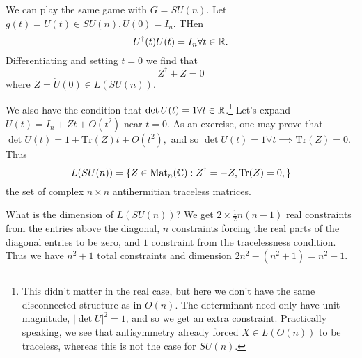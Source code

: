 \begin{exm}
We can play the same game with $G=SU(n)$. Let $g(t)=U(t)\in SU(n), U(0)=I_n$. THen
$$U^\dagger(t)U(t)= I_n \forall t\in \mathbb{R}.$$
Differentiating and setting $t=0$ we find that
$$Z^\dagger + Z=0$$ where $Z=\dot U(0)\in L(SU(n))$.

We also have the condition that $\det U(t)=1\forall t\in \mathbb{R}$.\footnote{This didn't matter in the real case, but here we don't have the same disconnected structure as in $O(n)$. The determinant need only have unit magnitude, $|\det U|^2=1$, and so we get an extra constraint. Practically speaking, we see that antisymmetry already forced $X\in L(O(n))$ to be traceless, whereas this is not the case for $SU(n)$.} Let's expand $U(t)=I_n+Z t+ O(t^2)$ near $t=0$. As an exercise, one may prove that $\det U(t) = 1+\text{Tr}(Z) t+O(t^2),$ and so $\det U(t)=1 \forall t \implies \text{Tr}(Z)=0$. Thus
$$L(SU(n))=\{Z \in \text{Mat}_n(\mathbb{C}): Z^\dagger = -Z, \text{Tr}(Z)=0,\}$$
the set of complex $n\times n$ antihermitian traceless matrices. 

What is the dimension of $L(SU(n))$? We get $2\times \frac{1}{2}n(n-1)$ real constraints from the entries above the diagonal, $n$ constraints forcing the real parts of the diagonal entries to be zero, and $1$ constraint from the tracelessness condition. Thus we have $n^2+1$ total constraints and dimension $2n^2-(n^2+1)=n^2-1$.
\end{exm}

